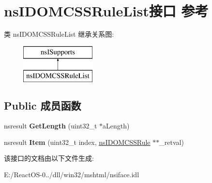 \hypertarget{interfacens_i_d_o_m_c_s_s_rule_list}{}\section{ns\+I\+D\+O\+M\+C\+S\+S\+Rule\+List接口 参考}
\label{interfacens_i_d_o_m_c_s_s_rule_list}
类 ns\+I\+D\+O\+M\+C\+S\+S\+Rule\+List 继承关系图\+:\begin{figure}[H]
\begin{center}
\leavevmode
\includegraphics[height=2.000000cm]{interfacens_i_d_o_m_c_s_s_rule_list}
\end{center}
\end{figure}
\subsection*{Public 成员函数}
\begin{DoxyCompactItemize}
\item 
\mbox{\label{interfacens_i_d_o_m_c_s_s_rule_list_a5a426811acd3064a8217891b250887d4}} 
nsresult {\bfseries Get\+Length} (uint32\+\_\+t $\ast$a\+Length)
\item 
\mbox{\label{interfacens_i_d_o_m_c_s_s_rule_list_ac91a872c232ce90899d51bbf74eef165}} 
nsresult {\bfseries Item} (uint32\+\_\+t index, \hyperlink{interfacens_i_d_o_m_c_s_s_rule}{ns\+I\+D\+O\+M\+C\+S\+S\+Rule} $\ast$$\ast$\+\_\+retval)
\end{DoxyCompactItemize}


该接口的文档由以下文件生成\+:\begin{DoxyCompactItemize}
\item 
E\+:/\+React\+O\+S-\/0../dll/win32/mshtml/nsiface.\+idl\end{DoxyCompactItemize}
